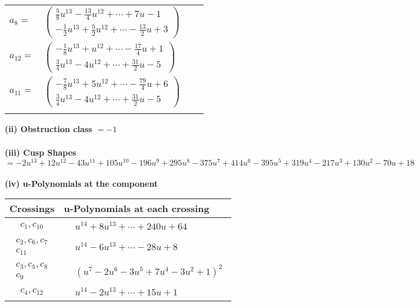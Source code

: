 \documentclass[1p]{elsarticle_modified}
\theoremstyle{definition}
\begin{document}
\begin{tabular}{m{7pt} m{180pt} m{7pt} m{180pt} }
\flushright $a_{8}=$&$\begin{pmatrix}\frac{5}{8} u^{13}-\frac{13}{4} u^{12}+\cdots+7 u-1\\-\frac{1}{2} u^{13}+\frac{5}{2} u^{12}+\cdots-\frac{13}{2} u+3\end{pmatrix}$ \\
\flushright $a_{12}=$&$\begin{pmatrix}-\frac{1}{8} u^{13}+u^{12}+\cdots-\frac{17}{4} u+1\\\frac{3}{4} u^{13}-4 u^{12}+\cdots+\frac{31}{2} u-5\end{pmatrix}$ \\
\flushright $a_{11}=$&$\begin{pmatrix}-\frac{7}{8} u^{13}+5 u^{12}+\cdots-\frac{79}{4} u+6\\\frac{3}{4} u^{13}-4 u^{12}+\cdots+\frac{31}{2} u-5\end{pmatrix}$\\&\end{tabular}
\flushleft \textbf{(ii) Obstruction class $= -1$}\\~\\
\flushleft \textbf{(iii) Cusp Shapes $= -2 u^{13}+12 u^{12}-43 u^{11}+105 u^{10}-196 u^9+295 u^8-375 u^7+414 u^6-395 u^5+319 u^4-217 u^3+130 u^2-70 u+18$}\\~\\
\newpage\renewcommand{\arraystretch}{1}
\flushleft \textbf{(iv) u-Polynomials at the component}\newline \\
\begin{tabular}{m{50pt}|m{274pt}}
Crossings & \hspace{64pt}u-Polynomials at each crossing \\
\hline $$\begin{aligned}c_{1},c_{10}\end{aligned}$$&$\begin{aligned}
&u^{14}+8 u^{13}+\cdots+240 u+64
\end{aligned}$\\
\hline $$\begin{aligned}c_{2},c_{6},c_{7}\\c_{11}\end{aligned}$$&$\begin{aligned}
&u^{14}-6 u^{13}+\cdots-28 u+8
\end{aligned}$\\
\hline $$\begin{aligned}c_{3},c_{5},c_{8}\\c_{9}\end{aligned}$$&$\begin{aligned}
&(u^7-2 u^6-3 u^5+7 u^4-3 u^2+1)^2
\end{aligned}$\\
\hline $$\begin{aligned}c_{4},c_{12}\end{aligned}$$&$\begin{aligned}
&u^{14}-2 u^{13}+\cdots+15 u+1
\end{aligned}$\\
\hline
\end{tabular}\\~\\
\end{document}
